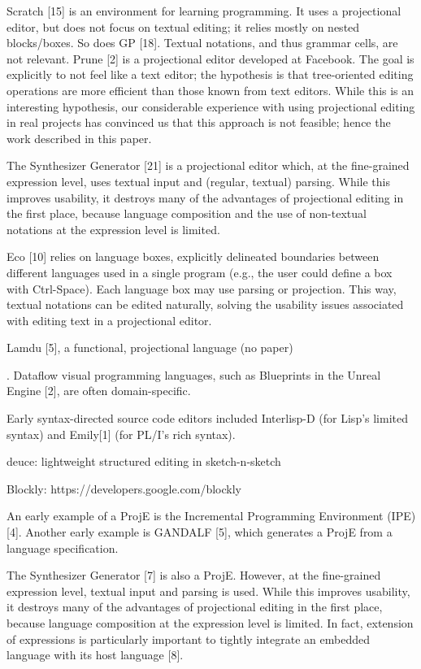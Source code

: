Scratch [15] is an environment for learning programming.
It uses a projectional editor, but does not focus on textual editing; it relies mostly on nested blocks/boxes.
So does GP [18].
Textual notations, and thus grammar cells, are not relevant.
Prune [2] is a projectional editor developed at Facebook.
The goal is explicitly to not feel like a text editor; the hypothesis is that tree-oriented editing operations are more efficient than those known from text editors.
While this is an interesting hypothesis, our considerable experience with using projectional editing in real projects has convinced us that this approach is not feasible; hence the work described in this paper.

The Synthesizer Generator [21] is a projectional editor which, at the fine-grained expression level, uses textual input and (regular, textual) parsing.
While this improves usability, it destroys many of the advantages of projectional editing in the first place, because language composition and the use of non-textual notations at the expression level is limited.

Eco [10] relies on language boxes, explicitly delineated boundaries between different languages used in a single program (e.g., the user could define a box with Ctrl-Space).
Each language box may use parsing or projection.
This way, textual notations can be edited naturally, solving the usability issues associated with editing text in a projectional editor.

Lamdu [5], a functional, projectional language (no paper)

. Dataflow visual programming languages, such as Blueprints in the Unreal Engine [2], are often domain-specific.


Early syntax-directed source code editors included Interlisp-D (for Lisp’s limited syntax) and Emily[1] (for PL/I’s rich syntax).

deuce: lightweight structured editing in sketch-n-sketch

Blockly: https://developers.google.com/blockly



An early example of a ProjE is the Incremental Programming Environment (IPE) [4].
Another early example is GANDALF [5], which generates a ProjE from a language specification.

The Synthesizer Generator [7] is also a ProjE.
However, at the fine-grained expression level, textual input and parsing is used.
While this improves usability, it destroys many of the advantages of projectional editing in the first place, because language composition at the expression level is limited.
In fact, extension of expressions is particularly important to tightly integrate an embedded language with its host language [8].


